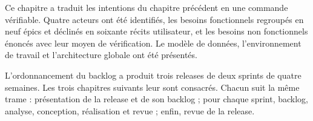
Ce chapitre a traduit les intentions du chapitre précédent en une commande vérifiable.
Quatre acteurs ont été identifiés, les besoins fonctionnels regroupés en neuf épics et
déclinés en soixante récits utilisateur, et les besoins non fonctionnels énoncés avec
leur moyen de vérification. Le modèle de données, l'environnement de travail et
l'architecture globale ont été présentés.

L'ordonnancement du backlog a produit trois releases de deux sprints de quatre semaines.
Les trois chapitres suivants leur sont consacrés. Chacun suit la même trame : présentation
de la release et de son backlog ; pour chaque sprint, backlog, analyse, conception,
réalisation et revue ; enfin, revue de la release.
